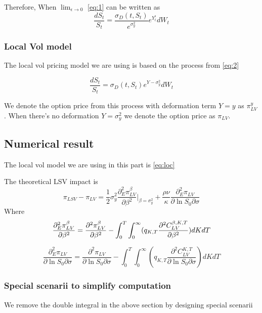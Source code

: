 \documentclass[12pt]{article}
\numberwithin{equation}{section}
\begin{document}
Therefore, When $\lim_{\epsilon \to 0}$ \ref{eq:1} can be written as
\begin{equation} \label{eq:2}
    \frac{dS_t}{S_t}=\frac{\sigma_D(t,S_t)}{e^{\sigma_y^2}}e^{Y_t^\epsilon}dW_t
\end{equation} 

\subsubsection{Local Vol model}
The local vol pricing model we are using is based on the process from \ref{eq:2}

\begin{equation} \label{eq:loc}
    \frac{dS_t}{S_t}=\sigma_D(t,S_t)e^{Y-\sigma_y^2}dW_t
\end{equation}

We denote the option price from this process with deformation term $Y=y$ 
as $\pi_{LV}^y$. When there's no deformation $Y=\sigma_y^2$ we denote the option price
as $\pi_{LV}$.

\subsection{Numerical result}
The local vol model we are using in this part is \ref{eq:loc}

The theoretical LSV impact is 
\begin{equation} \label{eq:3}
    \pi_{LSV}-\pi_{LV}=\frac 1 2 \sigma^2_y \frac{\partial_E^2 \pi^\beta_{LV}}{\partial \beta^2}|_{\beta=\sigma^2_y}
    +\frac{\rho \nu}{\kappa}\frac{\partial_E^2 \pi_{LV}}{\partial \ln S_0\partial \sigma}
\end{equation} 
Where
\begin{equation} \label{eq:4}
    \frac{\partial_E^2 \pi^\beta_{LV}}{\partial \beta^2}=\frac{\partial^2 \pi^\beta_{LV}}{\partial \beta^2}
    -\int_0^T\int_0^\infty (q_{K,T}\frac{\partial^2 C^{\beta,K,T}_{LV}}{\partial \beta^2})dKdT\\
\end{equation} 

\begin{equation} \label{eq:5}
    \frac{\partial_E^2 \pi_{LV}}{\partial \ln S_0\partial \sigma}=\frac{\partial^2\pi_{LV}}{\partial \ln S_0\partial \sigma}
    -\int_0^T\int_0^\infty (q_{K,T}\frac{\partial^2 C^{K,T}_{LV}}{\partial \ln S_0\partial \sigma})dKdT
\end{equation} 
\subsubsection{Special scenarii to simplify computation}
We remove the double integral in the above section by designing special scenarii
\end{document}

